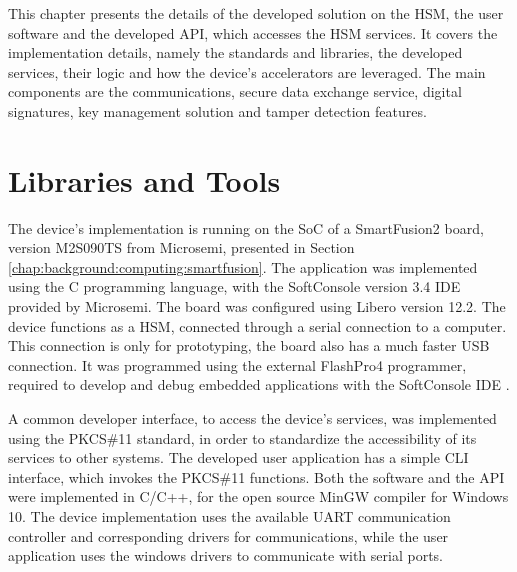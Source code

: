 \cleardoublepage
\label{chap:implementation}

This chapter presents the details of the developed solution on the HSM, the user software and the developed API, which accesses the HSM services.
It covers the implementation details, namely the standards and libraries, the developed services, their logic and how the device's accelerators are leveraged. The main components are the communications, secure data exchange service, digital signatures, key management solution and tamper detection features.

\section{Libraries and Tools}\label{chap:implementation:tools}

The device's implementation is running on the SoC of a SmartFusion2 board, version M2S090TS from Microsemi, presented in Section \ref{chap:background:computing:smartfusion}.
The application was implemented using the C programming language, with the SoftConsole version 3.4 \ac{IDE} provided by Microsemi. The board was configured using Libero version 12.2.
The device functions as a HSM, connected through a serial connection to a computer. This connection is only for prototyping, the board also has a much faster USB connection. It was programmed using the external FlashPro4 programmer, required to develop and debug embedded applications with the SoftConsole IDE \cite{smartfusionSecurityPractices}.

A common developer interface, to access the device's services, was implemented using the PKCS\#11 standard, in order to standardize the accessibility of its services to other systems. The developed user application has a simple \ac{CLI} interface, which invokes the PKCS\#11 functions.
Both the software and the API were implemented in C/C++, for the open source MinGW compiler for Windows 10.
The device implementation uses the available \ac{UART} communication controller and corresponding drivers for communications, while the user application uses the windows drivers to communicate with serial ports.

